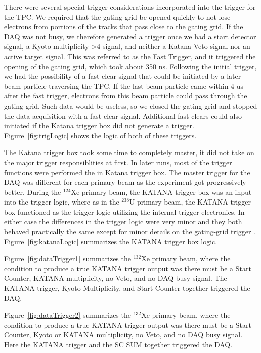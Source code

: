 There were several special trigger considerations incorporated into the trigger for the TPC. We required that the gating grid be opened quickly to not lose electrons from portions of the tracks that pass close to the gating grid. If the DAQ was not busy, we therefore generated a trigger once we had a start detector signal, a Kyoto multiplicity >4 signal, and neither a Katana Veto signal nor an active target signal. This was referred to as the Fast Trigger, and it triggered the opening of the gating grid, which took about 350 ns. Following the initial trigger, we had the possibility of a fast clear signal that could be initiated by a later beam particle traversing the TPC. If the last beam particle came within 4 us after the fast trigger, electrons from this beam particle could pass through the gating grid. Such data would be useless, so we closed the gating grid and stopped the data acquisition with a fast clear signal. Additional fast clears could also initiated if the Katana trigger box did not generate a trigger. Figure~\ref{fig:trigLogic} shows the logic of both of these triggers.

The Katana trigger box took some time to completely master, it did not take on the major trigger responsiblities at first. In later runs, most of the trigger functions were performed the in Katana trigger box. The master trigger for the DAQ was different for each primary beam as the experiment got progressively better. During the ${}^{124}$Xe primary beam, the KATANA trigger box was an input into the trigger logic, where as in the ${}^{238}$U primary beam, the KATANA trigger box functioned as the trigger logic utilizing the internal trigger electronics. In either case the differences in the trigger logic were very minor and they both behaved practically the same except for minor details on the gating-grid trigger \cite{jon}. Figure~\ref{fig:katanaLogic} summarizes the KATANA trigger box logic. 

Figure~\ref{fig:dataTrigger1} summarizes the ${}^{132}$Xe primary beam, where the condition to produce a true KATANA trigger output was there must be a Start Counter, KATANA multiplicity, no Veto, and no DAQ busy signal. The KATANA trigger, Kyoto Multiplicity, and Start Counter together triggered the DAQ. 

 Figure~\ref{fig:dataTrigger2} summarizes the ${}^{132}$Xe primary beam, where the condition to produce a true KATANA trigger output was there must be a Start Counter, Kyoto or KATANA multiplicity, no Veto, and no DAQ busy signal. Here the KATANA trigger and the SC SUM together triggered the DAQ. 
 
